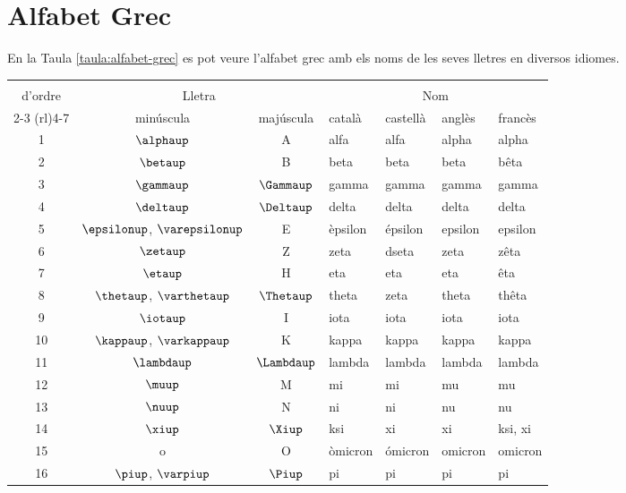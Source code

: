 \chapter{Alfabet Grec} \label{sec:alf-grec}

 En la Taula \vref{taula:alfabet-grec} es pot veure l'alfabet grec
 amb els noms de les seves lletres en diversos idiomes.

\begin{center}
    \label{taula:alfabet-grec}
   \begin{tabular}{cccllll}
   \toprule[1pt]
   \renewcommand*{\multirowsetup}{\centering}
   \multirow{2}{15mm}{\rule{0mm}{4.5mm}Número\\d'ordre} & \multicolumn{2}{c}{Lletra} &
   \multicolumn{4}{c}{Nom} \\
   \cmidrule(rl){2-3} \cmidrule(rl){4-7}
    & minúscula & majúscula & català & castellà &  anglès & francès\\
   \midrule
   1  & $\alphaup$ & A & alfa & alfa &  alpha & alpha\\
   2  & $\betaup$ & B & beta & beta &  beta & bêta\\
   3  & $\gammaup$ & $\Gammaup$ & gamma & gamma &  gamma & gamma\\
   4  & $\deltaup$ & $\Deltaup$ & delta & delta &  delta & delta\\
   5  & $\epsilonup$, $\varepsilonup$ & E & èpsilon & épsilon &  epsilon & epsilon\\
   6  & $\zetaup$ & Z & zeta & dseta &  zeta & zêta\\
   7  & $\etaup$ & H & eta & eta &  eta & êta\\
   8  & $\thetaup$, $\varthetaup$ & $\Thetaup$ & theta & zeta &  theta & thêta\\
   9  & $\iotaup$ & I & iota & iota &  iota & iota\\
   10 & $\kappaup$, $\varkappaup$ & K & kappa & kappa &  kappa & kappa\\
   11 & $\lambdaup$ & $\Lambdaup$ & lambda & lambda &  lambda &lambda\\
   12 & $\muup$ & M & mi & mi &  mu & mu\\
   13 & $\nuup$ & N & ni & ni &  nu & nu\\
   14 & $\xiup$ & $\Xiup$ & ksi & xi &  xi & ksi, xi\\
   15 & o & O & òmicron & ómicron &  omicron & omicron\\
   16 & $\piup$, $\varpiup$ & $\Piup$ & pi & pi &  pi & pi\\

\end{tabular}
\end{center}
